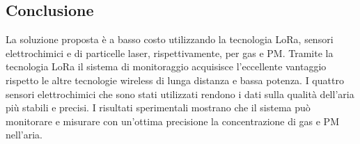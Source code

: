 \documentclass[a4paper]{report} %
\begin{document}
\subsection{Conclusione}
La soluzione proposta è a basso costo utilizzando la tecnologia LoRa, sensori elettrochimici e di particelle laser, rispettivamente, per gas e PM. Tramite la tecnologia LoRa il sistema di monitoraggio acquisisce l'eccellente vantaggio rispetto le altre tecnologie wireless di lunga distanza e bassa potenza. I quattro sensori elettrochimici che sono stati utilizzati rendono i dati sulla qualità dell'aria più stabili e precisi. I risultati sperimentali mostrano che il sistema può monitorare e misurare con un'ottima precisione la concentrazione di gas e PM nell'aria.



\end{document}
